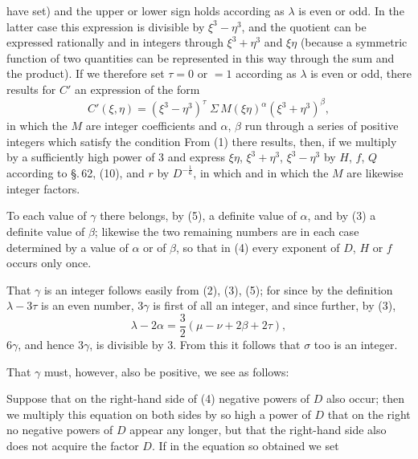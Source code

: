 have set) and the upper or lower sign holds according as
$\lambda$ is even or odd. In the latter case this expression is
divisible by $\xi^3 - \eta^3$, and the quotient can be expressed rationally
and in integers through $\xi^3 + \eta^3$ and $\xi\eta$ (because a
symmetric function of two quantities can be represented in this way
through the sum and the product). If we therefore set $\tau = 0$
or $= 1$ according as $\lambda$ is even or odd, there results
for $C'$ an expression of the form
\[
C'(\xi, \eta) = (\xi^3 - \eta^3)^\tau \; \Sigma \, M (\xi\eta)^\alpha (\xi^3 + \eta^3)^\beta,
\]
in which the $M$ are integer coefficients and $\alpha$, $\beta$ run through a series
of positive integers which satisfy the condition
From (1) there results, then, if we multiply by a sufficiently high power of 3 and express $\xi\eta$, $\xi^3+\eta^3$, $\xi^3-\eta^3$
by $H$, $f$, $Q$ according to \S.\,62, (10), and $r$ by $D^{-\frac{1}{6}}$,
in which
and in which the $M$ are likewise integer factors.

To each value of $\gamma$ there belongs, by (5), a definite
value of $\alpha$, and by (3) a definite value of $\beta$; likewise
the two remaining numbers are in each case determined by a value
of $\alpha$ or of $\beta$, so that in (4) every exponent of
$D$, $H$ or $f$ occurs only once.

That $\gamma$ is an integer follows easily from (2), (3), (5);
for since by the definition $\lambda - 3\tau$ is an even number,
$3\gamma$ is first of all an integer, and since further, by (3),
\[
\lambda - 2\alpha = \frac{3}{2}(\mu - \nu + 2\beta + 2\tau),
\]
$6\gamma$, and hence $3\gamma$, is divisible by 3. From this it follows that
$\sigma$ too is an integer.

That $\gamma$ must, however, also be positive, we see as follows:

Suppose that on the right-hand side of (4) negative powers
of $D$ also occur; then we multiply this equation
on both sides by so high a power of $D$ that on the right no
negative powers of $D$ appear any longer, but that the
right-hand side also does not acquire the factor $D$. If in the equation
so obtained we set
